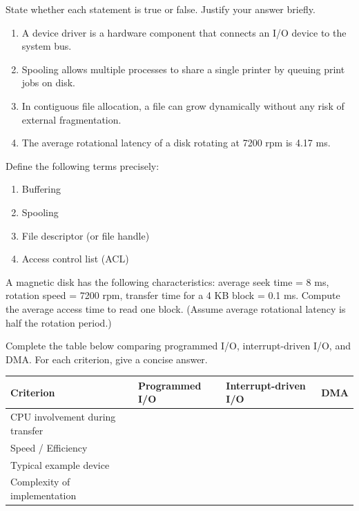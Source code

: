 \documentclass[11pt]{article}
\newcounter{popsec}
\newcounter{popsub}
\newcommand{\courssub}[1]{%
  \stepcounter{popsub}%
  \par\vspace{9pt}\noindent{\popxbold\fontsize{11.5}{13}\selectfont\color{popink}{\color{poporange}\thepopsec.\thepopsub}\hspace{6pt}#1}\par\nopagebreak\vspace{4pt}
}
\begin{document}
\begin{exercice}
State whether each statement is true or false. Justify your answer briefly.
\begin{enumerate}
\item A device driver is a hardware component that connects an I/O device to the system bus.
\item Spooling allows multiple processes to share a single printer by queuing print jobs on disk.
\item In contiguous file allocation, a file can grow dynamically without any risk of external fragmentation.
\item The average rotational latency of a disk rotating at 7200 rpm is 4.17 ms.
\end{enumerate}
\end{exercice}

\begin{exercice}[Definitions]
Define the following terms precisely:
\begin{enumerate}
\item Buffering
\item Spooling
\item File descriptor (or file handle)
\item Access control list (ACL)
\end{enumerate}
\end{exercice}

\begin{exercice}
A magnetic disk has the following characteristics: average seek time = 8 ms, rotation speed = 7200 rpm, transfer time for a 4 KB block = 0.1 ms. Compute the average access time to read one block. (Assume average rotational latency is half the rotation period.)
\end{exercice}

\courssub{I practise}

\begin{exercice}
Complete the table below comparing programmed I/O, interrupt-driven I/O, and DMA. For each criterion, give a concise answer.
\begin{center}
\begin{tabularx}{\linewidth}{|l|X|X|X|}
\hline
\textbf{Criterion} & \textbf{Programmed I/O} & \textbf{Interrupt-driven I/O} & \textbf{DMA} \\
\hline
CPU involvement during transfer & & & \\
\hline
Speed / Efficiency & & & \\
\hline
Typical example device & & & \\
\hline
Complexity of implementation & & & \\
\hline
\end{tabularx}
\end{center}
\end{exercice}
\end{document}
